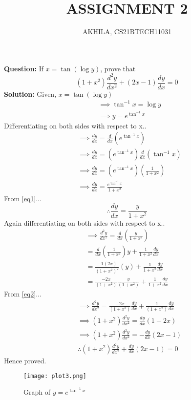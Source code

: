 \documentclass[journal,12pt,twocolumn]{IEEEtran}
\providecommand{\brak}[1]{\ensuremath{\left(#1\right)}}
\newcommand{\question}{\noindent\large \textbf{Question: }}
\newcommand{\solution}{\noindent\large \textbf{Solution: }}
\begin{document}
\title{ASSIGNMENT 2}
\author{AKHILA, CS21BTECH11031}

\maketitle
\question
If $x=\tan\brak{\log{y}}$, prove that 
\begin{equation*}
    \brak{1+x^2}\frac{d^2y}{dx^2}+\brak{2x-1}\frac{dy}{dx}=0
\end{equation*}
\solution
Given, $x=\tan\brak{\log{y}}$
\begin{align}
    &\implies \tan^{-1} x =\log{y}\\
    &\implies y= e^{\tan^{-1}x}\label{eq1}
\end{align}
Differentiating on both sides with respect to x..
\begin{align}
     &\implies\frac{dy}{dx}= \frac{d}{dx}\brak{e^{\tan^{-1} x}}\\
     &\implies\frac{dy}{dx}=\brak{e^{\tan^{-1} x}}\frac{d}{dx}\brak{\tan^{-1} x}\\
     &\implies\frac{dy}{dx}=\brak{e^{\tan^{-1} x}}\brak{\frac{1}{1+x^2}}\\
     &\implies\frac{dy}{dx}=\frac{ e^{\tan^{-1} x}}{1+x^2}
\end{align}
From \eqref{eq1}...
\begin{equation}
\label{eq2}
     \therefore \frac{dy}{dx} = \frac{y}{1+x^2} 
\end{equation}
Again differentiating on both sides with respect to x..
\begin{align}
    \implies\frac{d^2y}{dx^2} =\frac{d}{dx}\brak{\frac{y}{1+x^2}}\\
    =\frac{d}{dx}\brak{\frac{1}{1+x^2}}y+\frac{1}{1+x^2}\frac{dy}{dx} \\
    =\frac{-1(2x)}{\brak{1+x^2}^2} \brak{y}+\frac{1}{1+x^2}\frac{dy}{dx} \\
    =\frac{-2x}{(1+x^2)}\frac{y}{(1+x^2)} +\frac{1}{1+x^2}\frac{dy}{dx} 
\end{align}
From \eqref{eq2}...
\begin{align}
    &\implies \frac{d^2y}{dx^2}=\frac{-2x}{\brak{1+x^2}}\frac{dy}{dx} +\frac{1}{\brak{1+x^2}}\frac{dy}{dx} \\
    &\implies \brak{1+x^2}\frac{d^2y}{dx^2}=\frac{dy}{dx}\brak{1-2x}\\
    &\implies \brak{1+x^2}\frac{d^2y}{dx^2}=-\frac{dy}{dx}\brak{2x-1}\\
    &\therefore \brak{1+x^2}\frac{d^2y}{dx^2}+\frac{dy}{dx}\brak{2x-1}=0
\end{align}
     Hence proved.
\begin{figure}[H]
    \centering
    \texttt{[image: plot3.png]}
    \captionsetup{justification=centering,margin=1cm}
    \caption{Graph of $y= e^{\tan^{-1}x}$}
    \label{fig:plot3}
\end{figure}
\end{document}
